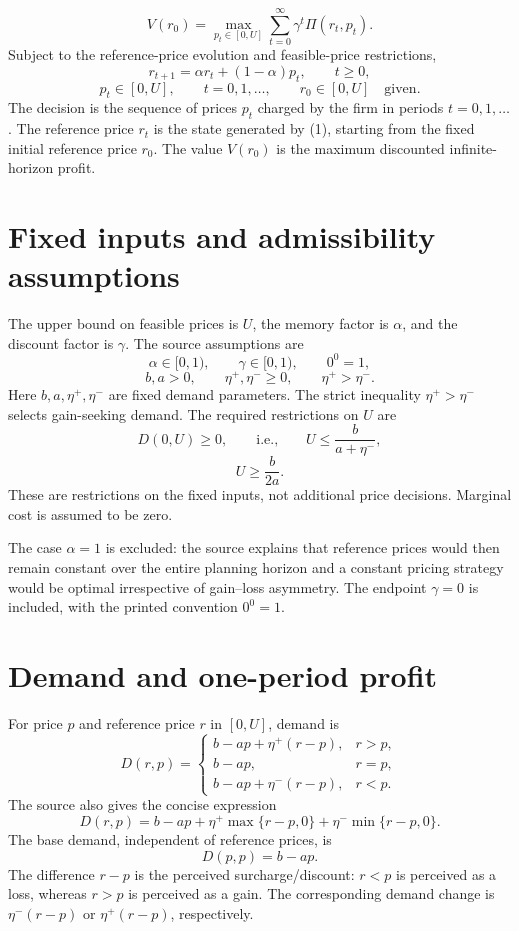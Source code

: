 \documentclass{article}
\begin{document}
\begin{equation}
V(r_0)=\max_{p_t\in[0,U]}\sum_{t=0}^{\infty}\gamma^t\Pi(r_t,p_t).
\tag{3}
\end{equation}
Subject to the reference-price evolution and feasible-price restrictions,
\begin{equation}
r_{t+1}=\alpha r_t+(1-\alpha)p_t,\qquad t\geq 0,
\tag{1}
\end{equation}
\[
p_t\in[0,U],\qquad t=0,1,\ldots,
\qquad r_0\in[0,U]\quad\text{given}.
\]
The decision is the sequence of prices $p_t$ charged by the firm in periods $t=0,1,\ldots$. The reference price $r_t$ is the state generated by (1), starting from the fixed initial reference price $r_0$. The value $V(r_0)$ is the maximum discounted infinite-horizon profit.

\section*{Fixed inputs and admissibility assumptions}
The upper bound on feasible prices is $U$, the memory factor is $\alpha$, and the discount factor is $\gamma$. The source assumptions are
\[
\alpha\in[0,1),\qquad \gamma\in[0,1),\qquad 0^0=1,
\]
\[
b,a>0,\qquad \eta^+,\eta^-\geq 0,\qquad \eta^+>\eta^-.
\]
Here $b,a,\eta^+,\eta^-$ are fixed demand parameters. The strict inequality $\eta^+>\eta^-$ selects gain-seeking demand. The required restrictions on $U$ are
\[
D(0,U)\geq 0,\qquad\text{i.e.,}\qquad U\leq\frac{b}{a+\eta^-},
\]
\[
U\geq\frac{b}{2a}.
\]
These are restrictions on the fixed inputs, not additional price decisions. Marginal cost is assumed to be zero.

The case $\alpha=1$ is excluded: the source explains that reference prices would then remain constant over the entire planning horizon and a constant pricing strategy would be optimal irrespective of gain--loss asymmetry. The endpoint $\gamma=0$ is included, with the printed convention $0^0=1$.

\section*{Demand and one-period profit}
For price $p$ and reference price $r$ in $[0,U]$, demand is
\begin{equation}
D(r,p)=
\begin{cases}
b-ap+\eta^+(r-p),&r>p,\\
b-ap,&r=p,\\
b-ap+\eta^-(r-p),&r<p.
\end{cases}
\tag{2}
\end{equation}
The source also gives the concise expression
\[
D(r,p)=b-ap+\eta^+\max\{r-p,0\}+\eta^-\min\{r-p,0\}.
\]
The base demand, independent of reference prices, is
\[
D(p,p)=b-ap.
\]
The difference $r-p$ is the perceived surcharge/discount: $r<p$ is perceived as a loss, whereas $r>p$ is perceived as a gain. The corresponding demand change is $\eta^-(r-p)$ or $\eta^+(r-p)$, respectively.
\end{document}
